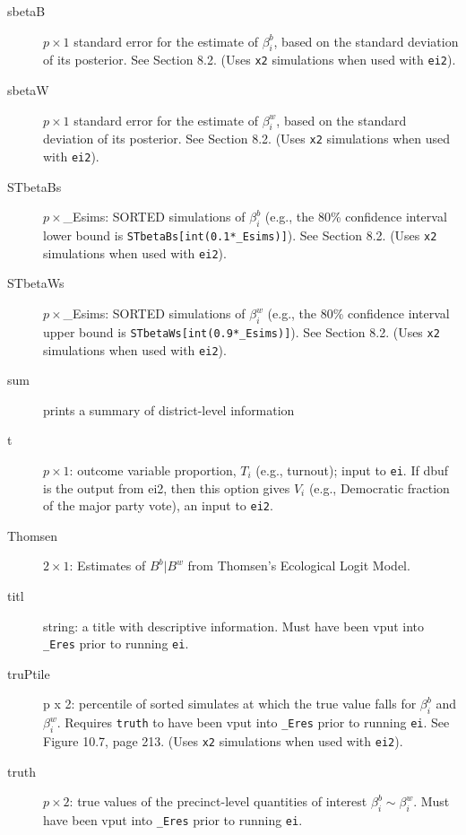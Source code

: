 \documentclass[11pt,titlepage]{article}
\begin{document}
\begin{description}
\item[sbetaB] $p\times 1$ standard error for the estimate of
  $\beta_i^b$, based on the standard deviation of its posterior.  See
  Section 8.2.  (Uses \texttt{x2} simulations when used
  with \texttt{ei2}).

\item[sbetaW] $p\times 1$ standard error for the estimate of
  $\beta_i^w$, based on the standard deviation of its posterior.  See
  Section 8.2.  (Uses \texttt{x2} simulations when used
  with \texttt{ei2}).

\item[STbetaBs] $p\times$\_Esims: SORTED simulations of $\beta_i^b$
  (e.g., the 80\% confidence interval lower bound is
  \texttt{STbetaBs[int(0.1*\_Esims)]}).  See Section 8.2.
  (Uses \texttt{x2} simulations when used with \texttt{ei2}).

\item[STbetaWs] $p\times$\_Esims: SORTED simulations of $\beta_i^w$
  (e.g., the 80\% confidence interval upper bound is
  \texttt{STbetaWs[int(0.9*\_Esims)]}).  See Section 8.2.
  (Uses \texttt{x2} simulations when used with \texttt{ei2}).

\item[sum] prints a summary of district-level information

\item[t] $p\times 1$: outcome variable proportion, $T_i$ (e.g.,
  turnout); input to \texttt{ei}.  If dbuf is the output from ei2,
  then this option gives $V_i$ (e.g., Democratic fraction of the major
  party vote), an input to \texttt{ei2}.

\item[Thomsen] $2\times 1$: Estimates of $B^b|B^w$ from Thomsen's
  Ecological Logit Model.

\item[titl] string: a title with descriptive information. Must have
  been vput into \texttt{\_Eres} prior to running \texttt{ei}.

\item[truPtile] p x 2: percentile of sorted simulates at which the
  true value falls for $\beta_i^b$ and $\beta_i^w$.  Requires
  \texttt{truth} to have been vput into \texttt{\_Eres} prior to
  running \texttt{ei}. See Figure 10.7, page 213.  (Uses \texttt{x2}
  simulations when used with \texttt{ei2}).

\item[truth] $p\times 2$: true values of the precinct-level quantities
  of interest $\beta_i^b\sim\beta_i^w$.  Must have been vput into
  \texttt{\_Eres} prior to running \texttt{ei}.


\end{description}
\end{document}
